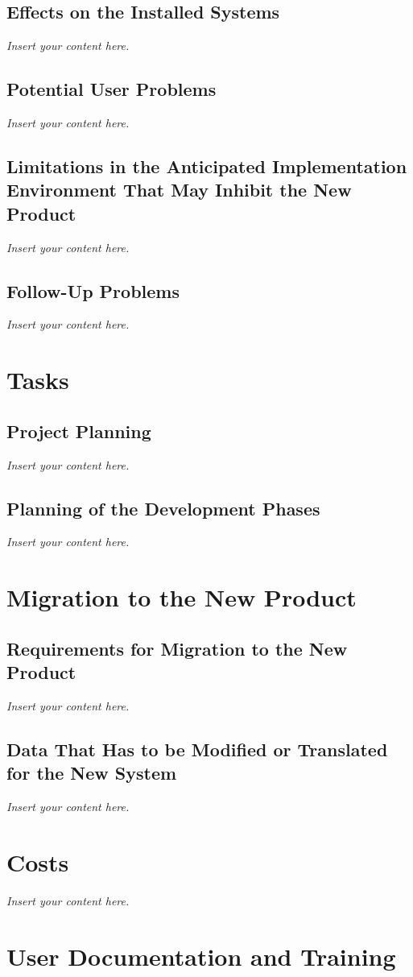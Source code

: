 \documentclass[12pt]{article}
\newcommand{\lips}{\textit{Insert your content here.}}
\begin{document}
\subsection{Effects on the Installed Systems}
\lips
\subsection{Potential User Problems}
\lips
\subsection{Limitations in the Anticipated Implementation Environment That May
  Inhibit the New Product}
\lips
\subsection{Follow-Up Problems}
\lips

\section{Tasks}
\subsection{Project Planning}
\lips
\subsection{Planning of the Development Phases}
\lips

\section{Migration to the New Product}
\subsection{Requirements for Migration to the New Product}
\lips
\subsection{Data That Has to be Modified or Translated for the New System}
\lips

\section{Costs}
\lips
\section{User Documentation and Training}
\end{document}
